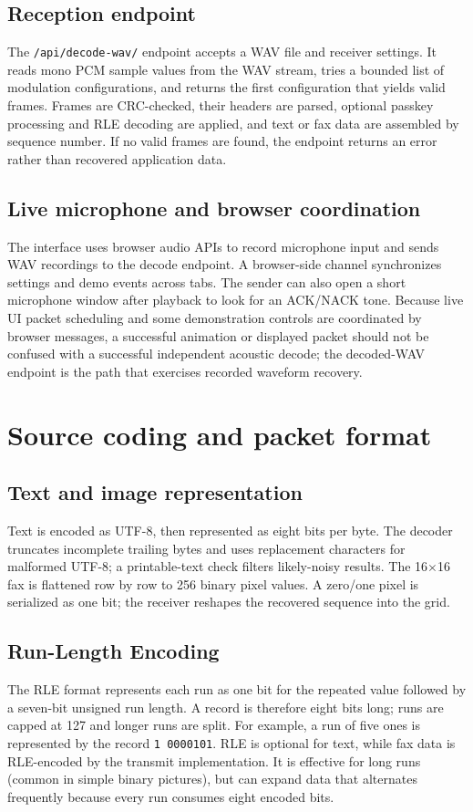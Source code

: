 \documentclass[11pt,a4paper]{article}
\begin{document}
\subsection{Reception endpoint}
The \texttt{/api/decode-wav/} endpoint accepts a WAV file and receiver settings. It reads mono PCM sample values from the WAV stream, tries a bounded list of modulation configurations, and returns the first configuration that yields valid frames. Frames are CRC-checked, their headers are parsed, optional passkey processing and RLE decoding are applied, and text or fax data are assembled by sequence number. If no valid frames are found, the endpoint returns an error rather than recovered application data.

\subsection{Live microphone and browser coordination}
The interface uses browser audio APIs to record microphone input and sends WAV recordings to the decode endpoint. A browser-side channel synchronizes settings and demo events across tabs. The sender can also open a short microphone window after playback to look for an ACK/NACK tone. Because live UI packet scheduling and some demonstration controls are coordinated by browser messages, a successful animation or displayed packet should not be confused with a successful independent acoustic decode; the decoded-WAV endpoint is the path that exercises recorded waveform recovery.

\section{Source coding and packet format}
\label{sec:source}

\subsection{Text and image representation}
Text is encoded as UTF-8, then represented as eight bits per byte. The decoder truncates incomplete trailing bytes and uses replacement characters for malformed UTF-8; a printable-text check filters likely-noisy results. The 16$\times$16 fax is flattened row by row to 256 binary pixel values. A zero/one pixel is serialized as one bit; the receiver reshapes the recovered sequence into the grid.

\subsection{Run-Length Encoding}
The RLE format represents each run as one bit for the repeated value followed by a seven-bit unsigned run length. A record is therefore eight bits long; runs are capped at 127 and longer runs are split. For example, a run of five ones is represented by the record \texttt{1 0000101}. RLE is optional for text, while fax data is RLE-encoded by the transmit implementation. It is effective for long runs (common in simple binary pictures), but can expand data that alternates frequently because every run consumes eight encoded bits.
\end{document}
